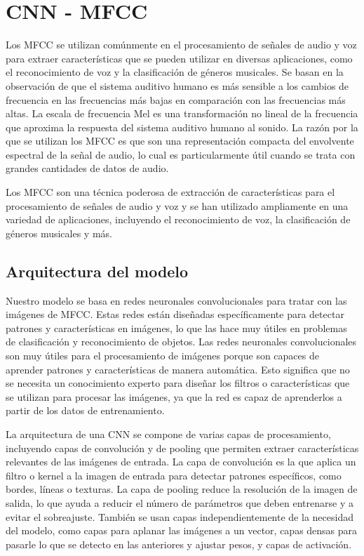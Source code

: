 \documentclass[colorinlistoftodos,twoside,twocolumn,10pt]{article} %
\begin{document}
\section{CNN - MFCC}
Los MFCC se utilizan comúnmente en el procesamiento de señales de audio y voz para extraer características que se pueden utilizar en diversas aplicaciones, como el reconocimiento de voz y la clasificación de géneros musicales. Se basan en la observación de que el sistema auditivo humano es más sensible a los cambios de frecuencia en las frecuencias más bajas en comparación con las frecuencias más altas. La escala de frecuencia Mel es una transformación no lineal de la frecuencia que aproxima la respuesta del sistema auditivo humano al sonido. La razón por la que se utilizan los MFCC es que son una representación compacta del envolvente espectral de la señal de audio, lo cual es particularmente útil cuando se trata con grandes cantidades de datos de audio.

Los MFCC son una técnica poderosa de extracción de características para el procesamiento de señales de audio y voz y se han utilizado ampliamente en una variedad de aplicaciones, incluyendo el reconocimiento de voz, la clasificación de géneros musicales y más.

\subsection{Arquitectura del modelo}
Nuestro modelo se basa en redes neuronales convolucionales para tratar con las imágenes de MFCC. Estas redes están diseñadas específicamente para detectar patrones y características en imágenes, lo que las hace muy útiles en problemas de clasificación y reconocimiento de objetos. Las redes neuronales convolucionales son muy útiles para el procesamiento de imágenes porque son capaces de aprender patrones y características de manera automática. Esto significa que no se necesita un conocimiento experto para diseñar los filtros o características que se utilizan para procesar las imágenes, ya que la red es capaz de aprenderlos a partir de los datos de entrenamiento.

La arquitectura de una CNN se compone de varias capas de procesamiento, incluyendo capas de convolución y de pooling que permiten extraer características relevantes de las imágenes de entrada. La capa de convolución es la que aplica un filtro o kernel a la imagen de entrada para detectar patrones específicos, como bordes, líneas o texturas. La capa de pooling reduce la resolución de la imagen de salida, lo que ayuda a reducir el número de parámetros que deben entrenarse y a evitar el sobreajuste. También se usan capas independientemente de la necesidad del modelo, como capas para aplanar las imágenes a un vector, capas densas para pasarle lo que se detecto en las anteriores y ajustar pesos, y capas de activación.
\end{document}
